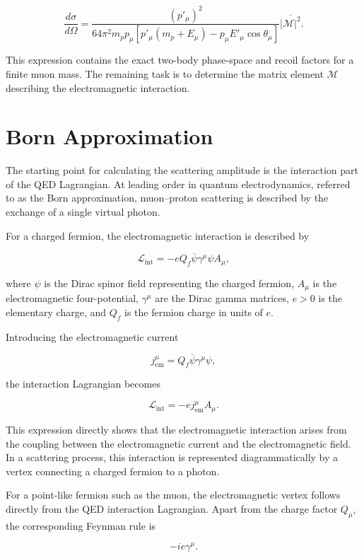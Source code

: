 \begin{equation}
\frac{d\sigma}{d\Omega}
=
\frac{(p'_\mu)^2}
{64\pi^2m_p p_\mu
\left[
p'_\mu(m_p+E_\mu)
-p_\mu E'_\mu\cos\theta_\mu
\right]}
\overline{|\mathcal{M}|^2}.
\label{eq:diff_cross_section_exact}
\end{equation}

This expression contains the exact two-body phase-space and recoil factors for a finite muon mass. The remaining task is to determine the matrix element \(\mathcal{M}\) describing the electromagnetic interaction.


\section{Born Approximation}

The starting point for calculating the scattering amplitude is the interaction part of the QED Lagrangian. At leading order in quantum electrodynamics, referred to as the Born approximation, muon--proton scattering is described by the exchange of a single virtual photon.

For a charged fermion, the electromagnetic interaction is described by

\[
\mathcal{L}_{\mathrm{int}}
=
-eQ_f\overline{\psi}\gamma^\mu\psi A_\mu,
\]

where \(\psi\) is the Dirac spinor field representing the charged fermion, \(A_\mu\) is the electromagnetic four-potential, \(\gamma^\mu\) are the Dirac gamma matrices, \(e>0\) is the elementary charge, and \(Q_f\) is the fermion charge in units of \(e\).

Introducing the electromagnetic current

\[
j^\mu_{\mathrm{em}}
=
Q_f\overline{\psi}\gamma^\mu\psi,
\]

the interaction Lagrangian becomes

\[
\mathcal{L}_{\mathrm{int}}
=
-ej^\mu_{\mathrm{em}}A_\mu.
\]

This expression directly shows that the electromagnetic interaction arises from the coupling between the electromagnetic current and the electromagnetic field. In a scattering process, this interaction is represented diagrammatically by a vertex connecting a charged fermion to a photon.

For a point-like fermion such as the muon, the electromagnetic vertex follows directly from the QED interaction Lagrangian. Apart from the charge factor \(Q_\mu\), the corresponding Feynman rule is

\[
-ie\gamma^\mu.
\]

